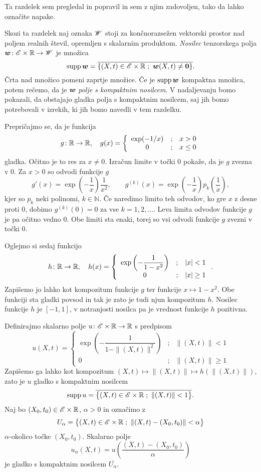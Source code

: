 \textcolor[rgb]{0,0.58,0}{Ta razdelek sem pregledal in popravil in sem z njim zadovoljen, tako da lahko označite napake.}

Skozi ta razdelek naj oznaka $\mathscr W$ stoji za
končnorazsežen vektorski prostor nad poljem realnih števil, opremljen s skalarnim produktom.
\emph{Nosilec} tenzorskega polja $\boldsymbol w\colon\mathscr E\times\mathbb R\to\mathscr W$ je množica
\[ \mathrm{supp}\,\boldsymbol w=\overline{\{ (X,t)\in\mathscr E\times\mathbb R\; ;\ \boldsymbol w(X,t)\neq\boldsymbol 0 \}}. \]
Črta nad množico pomeni zaprtje množice. Če je $\mathrm{supp}\,\boldsymbol w$ kompaktna množi\-ca, potem rečemo,
da je $\boldsymbol w$ \emph{polje s kompaktnim nosilcem}. V nadaljevanju bomo pokazali, da obstajajo gladka polja
s kompaktnim nosilcem, saj jih bomo potrebovali v izrekih, ki jih bomo navedli v tem razdelku.

Prepričajmo se, da je funkcija
\[
	g\colon\mathbb R\to\mathbb R,\quad g(x)=\left\{\begin{array}{ccl}
	\exp(-1/x)&;&x>0 \\ 0&;&x\leq 0 \end{array}\right.
\]
gladka. Očitno je to res za $x\neq 0$. Izračun limite v točki $0$ pokaže, da
je $g$ zvezna v 0. Za $x>0$ so odvodi funkcije $g$
\[
	g'(x)=\exp\left(-\frac{1}{x}\right)\frac{1}{x^2},\qquad
	g^{(k)}(x)=\exp\left(-\frac{1}{x}\right)p_k\left(\frac{1}{x}\right),
\]
kjer so $p_k$ neki polinomi, $k\in\mathbb{N}$. Če naredimo limito teh odvodov, ko
gre $x$ z desne proti 0, dobimo $g^{(k)}(0)=0$ za vse $k=1,2,\dots$. Leva limita
odvodov funkcije $g$ je pa očitno vedno 0. Obe limiti sta enaki, torej so vsi odvodi
funkcije $g$ zvezni v točki 0.

Oglejmo si sedaj funkcijo
\[
	h\colon\mathbb R\to\mathbb R,\quad h(x)=\left\{\begin{array}{ccl}
	\exp\left(-\dfrac{1}{1-x^2}\right)&;&|x|<1 \\ 0&;&|x|\geq 1 \end{array}\right. .
\]
Zapišemo jo lahko kot kompozitum funkcije $g$ ter funkcije $x\mapsto 1-x^2$. Obe funkciji sta
gladki povsod in tak je zato je tudi njun kompozitum $h$. Nosilec funkcije $h$ je
$[-1,1]$, v notranjosti nosilca pa je vrednost funkcije $h$ pozitivna.

Definirajmo skalarno polje $u\colon\mathscr E\times\mathbb R\to\mathbb R$ s predpisom
\[
	u(X,t)=\left\{\begin{array}{ccl}
	\exp\left(-\dfrac{1}{1-\|(X,t)\|^2}\right)&;&\|(X,t)\|<1 \\ 0&;&\|(X,t)\|\geq 1 \end{array}\right.
\]
Zapišemo ga lahko kot kompozitum $(X,t)\mapsto\|(X,t)\|\mapsto h(\|(X,t)\|)$, zato je
$u$ gladko s kompaktnim nosilcem
\[ \textrm{supp}\, u=\overline{\big\{(X,t)\in\mathscr E\times\mathbb R\; ;\ \|(X,t)\|<1 \big\}}. \]
Naj bo $(X_0,t_0)\in\mathscr E\times\mathbb R$, $\alpha > 0$ in označimo z
\begin{equation}\label{e:mnU}
	U_{\alpha}=\big\{(X,t)\in\E\times\R\; ;\ \|(X,t)-(X_0,t_0)\|<\alpha \big\}
\end{equation}
$\alpha$-okolico točke $(X_0,t_0)$. Skalarno polje
\begin{equation}\label{e:funu}
	u_{\alpha}(X,t)=u\left(\frac{(X,t)-(X_0,t_0)}{\alpha}\right)
\end{equation}
je gladko s kompaktnim nosilcem $\overline{U_{\alpha}}$.

